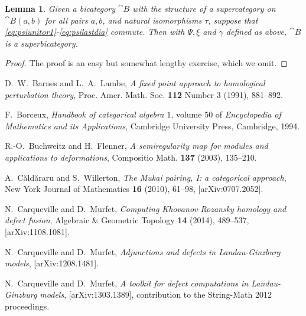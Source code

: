 \documentclass[english,letter paper,12pt,leqno]{article}
\newtheorem{lemma}[theorem]{Lemma}
\theoremstyle{example}
\numberwithin{equation}{section}
\begin{document}
\begin{lemma}\label{lemma:constructingsuper}
Given a bicategory $\cat{B}$ with the structure of a supercategory on $\cat{B}(a,b)$ for all pairs $a,b$, and natural isomorphisms $\tau$, suppose that \eqref{eq:psiunitor1}-\eqref{eq:psilastdia} commute. Then with $\Psi, \xi$ and $\gamma$ defined as above, $\cat{B}$ is a superbicategory.
\end{lemma}
\begin{proof}
The proof is an easy but somewhat lengthy exercise, which we omit.
\end{proof}


\providecommand{\bysame}{\leavevmode\hbox to3em{\hrulefill}\thinspace}
\providecommand{\href}[2]{#2}
\begin{thebibliography}{BHLS03}


D.~W.~Barnes and L.~A.~Lambe, \emph{A fixed point approach to homological perturbation theory}, Proc. Amer.
  Math. Soc. \textbf{112} Number 3 (1991), 881--892.

F.~Borceux, \textsl{Handbook of categorical algebra $1$}, volume $50$ of \textsl{Encyclopedia of Mathematics and its Applications}, Cambridge University Press, Cambridge, 1994.

R.-O.~Buchweitz and H.~Flenner, \textsl{A semiregularity map for modules and applications to deformations}, Compositio Math. \textbf{137} (2003), 135--210.
    
A.~{C\u ald\u araru} and S.~Willerton, \textsl{The Mukai pairing, I: a categorical approach},
New York Journal of Mathematics \textbf{16} (2010), 61--98, 
  \href{http://arxiv.org/abs/0707.2052}{[arXiv:0707.2052]}.

N.~Carqueville and D.~Murfet, \textsl{Computing {K}hovanov-{R}ozansky homology and defect fusion}, Algebraic \& Geometric Topology \textbf{14} (2014), 489--537, \href{http://arxiv.org/abs/1108.1081}{[arXiv:1108.1081]}. 

N.~Carqueville and D.~Murfet, \textsl{Adjunctions and defects in {L}andau-{G}inzburg models}, \href{http://arxiv.org/abs/1208.1481}{[arXiv:1208.1481]}.

N.~Carqueville and D.~Murfet, \textsl{A toolkit for defect computations in Landau-Ginzburg models}, \href{http://arxiv.org/abs/1303.1389}{[arXiv:1303.1389]}, contribution to the String-Math 2012 proceedings.


\end{thebibliography}
\end{document}
